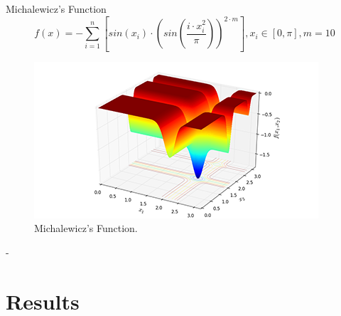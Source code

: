\documentclass{article}
\begin{document}
Michalewicz's Function
$$ f(x) = -\sum_{i=1}^n \left[sin(x_i) \cdot \left( sin\left( \frac{i \cdot x_i^2}{\pi}  \right) \right)^{2 \cdot m} \right] ,
 x_i \in \left[ 0, \pi \right] ,  m = 10$$

\begin{figure}[!h]
  \includegraphics[width=\textwidth,height=\textheight,keepaspectratio]{Michalewicz_functions}
  \caption{Michalewicz's Function.}
\end{figure}
-
\newline
\newline
\newline
\newline
\newline
\newline


\section{Results}
\end{document}
